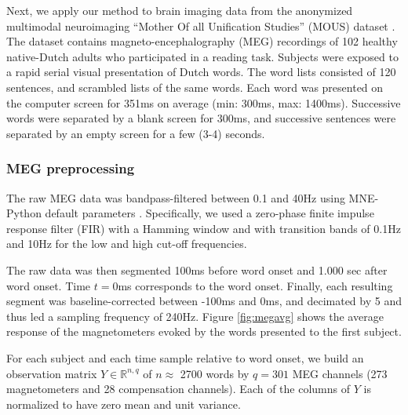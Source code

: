 
Next, we apply our method to brain imaging data from the anonymized multimodal
neuroimaging ``Mother Of all Unification Studies'' (MOUS) dataset
\citep{schoffelen2019204}. The dataset contains magneto-encephalography (MEG)
recordings of 102 healthy native-Dutch adults who participated in a reading
task.
%
Subjects were exposed to a rapid serial visual presentation of Dutch words. The
word lists consisted of 120 sentences, and scrambled lists of the same words.
Each word was presented on the computer screen for 351ms on average (min: 300ms,
max: 1400ms). Successive words were separated by a blank screen for 300ms, and
successive sentences were separated by an empty screen for a few (3-4) seconds.

\subsubsection{MEG preprocessing}

The raw MEG data was bandpass-filtered between 0.1 and 40Hz using MNE-Python
default parameters \citep{gramfort2013meg, gramfort2014mne}. Specifically, we used a zero-phase finite impulse
response filter (FIR) with a Hamming window and with transition bands of 0.1Hz
and 10Hz for the low and high cut-off frequencies.

The raw data was then segmented 100ms before word onset and 1.000 sec after
word onset. Time $t=0$ms corresponds to the word onset. Finally, each resulting
segment was baseline-corrected between -100ms and 0ms, and decimated by 5 and
thus led a sampling frequency of 240Hz. Figure \ref{fig:megavg} shows
the average response of the magnetometers evoked by the words presented to the
first subject.

For each subject and each time sample relative to word onset, we
build an observation matrix $Y \in \mathbb{R}^{n, q}$ of $n\approx$ 2700 words
by $q=301$ MEG channels (273 magnetometers and 28 compensation channels). Each
of the columns of $Y$ is normalized to have zero mean and unit variance.

